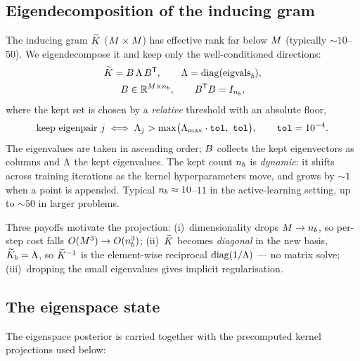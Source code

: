 \subsection{Eigendecomposition of the inducing gram}\label{sec:eigdecomp}

The inducing gram $\widetilde{K}$ ($M\times M$) has effective rank far below
$M$ (typically $\sim10$--$50$). We eigendecompose it and keep only the
well-conditioned directions:
\begin{equation}
\begin{gathered}
  \widetilde{K}=B\,\Lambda\,B^{\mathsf{T}},\qquad
  \Lambda=\operatorname{diag}(\text{eigvals}_b), \\
  B\in\mathbb{R}^{M\times n_{b}},\qquad B^{\mathsf{T}}B=I_{n_{b}},
\end{gathered}
  \label{eq:eigdecomp}
\end{equation}
where the kept set is chosen by a \emph{relative} threshold with an absolute
floor,
\begin{equation}
  \text{keep eigenpair }j \iff \Lambda_j > \max\!\big(\Lambda_{\max}\cdot\texttt{tol},\ \texttt{tol}\big),
  \qquad \texttt{tol}=10^{-4}.
  \label{eq:eigthresh}
\end{equation}
The eigenvalues are taken in ascending order; $B$ collects the kept eigenvectors
as columns and $\Lambda$ the kept eigenvalues. The kept count $n_{b}$ is
\emph{dynamic}: it shifts across training iterations as the kernel hyperparameters
move, and grows by $\sim1$ when a point is appended. Typical $n_{b}\approx10$--$11$
in the active-learning setting, up to $\sim50$ in larger problems.

Three payoffs motivate the projection: (i)~dimensionality drops $M\to n_{b}$, so
per-step cost falls $O(M^3)\to O(n_{b}^3)$; (ii)~$\widetilde{K}$ becomes
\emph{diagonal} in the new basis, $\widetilde{K}_{b}=\Lambda$, so $\widetilde{K}^{-1}$ is the
element-wise reciprocal $\operatorname{diag}(1/\Lambda)$ --- no matrix solve; (iii)~dropping the
small eigenvalues gives implicit regularisation.

\subsection{The eigenspace state}\label{sec:eigstate}

The eigenspace posterior is carried together with the precomputed kernel
projections used below:

